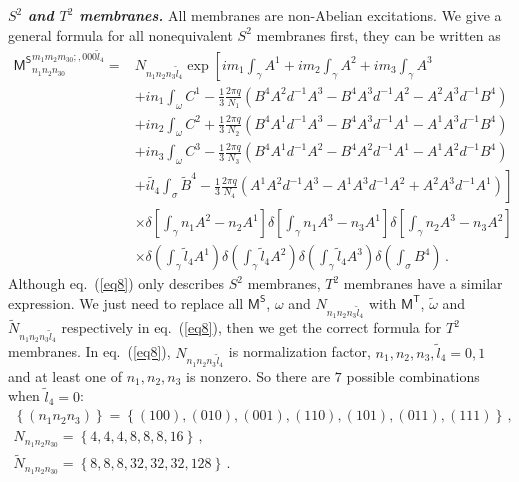 \documentclass[11pt,nofootinbib,preprint]{revtex4-1}
\begin{document}
\textbf{\textit{$S^2$ and $T^2$ membranes.}}
All membranes are non-Abelian excitations. We give a general formula for all nonequivalent $S^2$ membranes first, they can be written as 
\begin{align}
	{\mathsf{M}^{\mathsf{S}}}_{n_1n_2n_30}^{m_1m_2m_30;,000\tilde{l}_4}=&N_{n_1n_2n_3\tilde{l}_4}\exp \left[ im_1\int_{\gamma}{A^1}+im_2\int_{\gamma}{A^2}+im_3\int_{\gamma}{A^3} \right. \nonumber
	\\
	&+in_1\int_{\omega}{C^1-\frac{1}{3}\frac{2\pi q}{N_1}\left( B^4A^2d^{-1}A^3-B^4A^3d^{-1}A^2-A^2A^3d^{-1}B^4 \right)} \nonumber
	\\
	&+in_2\int_{\omega}{C^2+\frac{1}{3}\frac{2\pi q}{N_2}\left( B^4A^1d^{-1}A^3-B^4A^3d^{-1}A^1-A^1A^3d^{-1}B^4 \right)}\nonumber
	\\
	&+in_3\int_{\omega}{C^3-\frac{1}{3}\frac{2\pi q}{N_3}\left( B^4A^1d^{-1}A^2-B^4A^2d^{-1}A^1-A^1A^2d^{-1}B^4 \right)} \nonumber
	\\
	&\left.+i\tilde{l}_4\int_{\sigma}{\tilde{B}^4}-\frac{1}{3}\frac{2\pi q}{N_4}\left( A^1A^2d^{-1}A^3-A^1A^3d^{-1}A^2+A^2A^3d^{-1}A^1 \right) \right] \nonumber
	\\
	&\times \delta \left[ \int_{\gamma}{n_1A^2-n_2A^1} \right] \delta \left[ \int_{\gamma}{n_1A^3-n_3A^1} \right] \delta \left[ \int_{\gamma}{n_2A^3-n_3A^2} \right] \nonumber
	\\
	&\times \delta \left( \int_{\gamma}{\tilde{l}_4A^1} \right) \delta \left( \int_{\gamma}{\tilde{l}_4A^2} \right) \delta \left( \int_{\gamma}{\tilde{l}_4A^3} \right) \delta \left( \int_{\sigma}{B^4} \right) \,.
	\label{eq8}
\end{align}
Although eq.~(\ref{eq8}) only describes $S^2$ membranes, $T^2$ membranes have a similar expression. We just need to replace all $\mathsf{M^S}$, $\omega$ and $N_{n_1n_2n_3\tilde{l}_4}$ with $\mathsf{M^T}$, $\tilde{\omega}$ and $\tilde{N}_{n_1n_2n_3\tilde{l}_4}$ respectively in eq.~(\ref{eq8}), then we get the correct formula for $T^2$ membranes. In eq.~(\ref{eq8}), $N_{n_1n_2n_3\tilde{l}_4}$ is normalization factor, $n_1,n_2,n_3,\tilde{l}_4=0,1$ and at least one of $n_1,n_2,n_3$ is nonzero. So there are $7$ possible combinations when $\tilde{l}_4=0$:
\begin{gather}
	\left\{ \left( n_1n_2n_3 \right) \right\} =\left\{ \left( 100 \right) ,\left( 010 \right) ,\left( 001 \right) ,\left( 110 \right) ,\left( 101 \right) ,\left( 011 \right) ,\left( 111 \right) \right\}\,,
	\label{eq31-}  
	\\
	N_{n_1n_2n_30}=\left\{4,4,4,8,8,8,16\right\}\,,\nonumber
	\\
	\tilde{N}_{n_1n_2n_30}=\left\{8,8,8,32,32,32,128\right\}\,.
	\label{eq31}
\end{gather}
\end{document}
